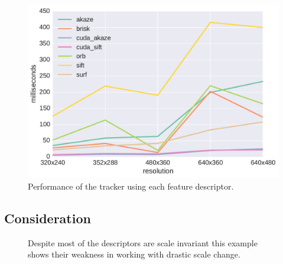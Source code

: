 \begin{figure}
	\includegraphics[width=0.95\linewidth]{imgs/tracker_fps.pdf}
\vspace{-2.5mm}	
\caption{Performance of the tracker using each feature descriptor.}
\label{fig:speed}
\end{figure}

\subsection{Consideration}


\begin{figure}[t]
	\vspace{2mm}
\centerline{%
	}
	\vspace{-2mm}
\caption{Despite most of the descriptors are scale invariant this example shows their weakness in working with drastic scale change.}
\vspace{-3mm}
\label{fig:tracking_results_scale}
\end{figure} 


